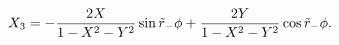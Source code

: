 \begin{equation}
X_3 = -{2 X \over 1-X^2-Y^2}  \sin \tilde r_- \phi +  {2 Y \over
  1-X^2-Y^2} \cos \tilde r_- \phi.
\end{equation}


